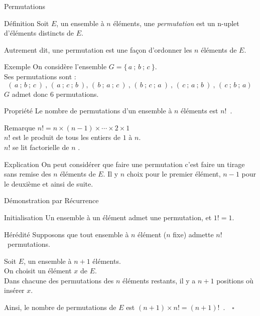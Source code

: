 \documentclass{coursbook}
\begin{document}
    \begin{Gpartie}{Permutations}
        \begin{Spartie}{Définition}
            Soit $E$, un ensemble à $n$ éléments, une \emph{permutation} est un n-uplet d'éléments distincts de $E$.

            Autrement dit, une permutation est une façon d'ordonner les $n$ éléments de $E$.
            \begin{SSpartie}{Exemple}
                On considère l'ensemble $G=\big\{\,a~;\,b~;\,c~\big\}$. \\ Ses permutations sont :
                \[(\,a~;\,b~;\,c~)~,\,(\,a~;\,c~;\,b~),\,(\,b~;\,a~;\,c~)~,\,(\,b~;\,c~;\,a~)~,\,(\,c~;\,a~;\,b~)~,\,(\,c~;\,b~;\,a)~\]
                $G$ admet donc 6 permutations.
            \end{SSpartie}
        \end{Spartie}
        \begin{Spartie}{Propriété}
            Le nombre de permutations d'un ensemble à $n$ éléments est $n!$~.
            \begin{SSpartie}{Remarque}
                $n! =n\times(n-1)\times\dotsb\times 2\times 1$ \\
                $n!$ est le produit de tous les entiers de $1$ à $n$. \\
                $n!$ se lit \og factorielle de $n$ \fg{}.
            \end{SSpartie}
            \begin{SSpartie}{Explication}
                On peut considérer que faire une permutation c'est faire un tirage sans remise des $n$ éléments de $E$. Il y $n$ choix pour le premier élément, $n-1$ pour le deuxième et ainsi de suite.
            \end{SSpartie}
            \begin{SSpartie}{Démonstration par Récurrence}
                \begin{SSSpartie}{Initialisation}
                    Un ensemble à un élément admet une permutation, et $1! =1$.
                \end{SSSpartie}
                \begin{SSSpartie}{Hérédité}
                    Supposons que tout ensemble à $n$ élément ($n$ fixe) admette $n!$~permutations.

                    Soit $E$, un ensemble à $n+1$ éléments. \\
                    On choisit un élément $x$ de $E$. \\
                    Dans chacune des permutations des $n$ éléments restants, il y a $n+1$ positions où insérer $x$.

                    Ainsi, le nombre de permutations de $E$ est $(n+1)\times n! =(n+1)!$~.$\quad\square$
                \end{SSSpartie}
            \end{SSpartie}
        \end{Spartie}
    \end{Gpartie}
\end{document}
